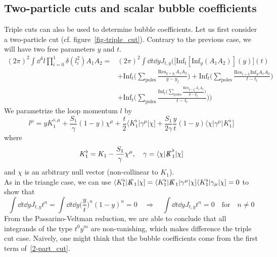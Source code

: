 \subsection*{Two-particle cuts and scalar bubble coefficients}
Triple cuts can also be used to determine bubble coefficients. 
Let us first consider a two-particle cut (cf. figure~\ref{fig-triple_cut}).
Contrary to the previous case, we will have two free parameters $y$ and $t$.
\begin{equation}\label{2-part_cut}
\begin{split}
(2\pi)^2\int \dd^4 l \prod_{i=0}^1 \delta(l_i^2) A_1 A_2 = & 
(2\pi)^2\int \dd t\dd y J_{t,y}\Big(\big[\mathrm{Inf}_t [\mathrm{Inf}_y(A_1A_2)](y)\big](t) 
\\&
+
\mathrm{Inf}_t\big(\sum_{\textrm{poles}}\frac{\mathrm{Res}_{y = y_i}A_1A_2}{y-y_j})
+
\mathrm{Inf}_t\big(\sum_{\textrm{poles}}\frac{\mathrm{Res}_{t = t_l}\mathrm{Inf}_y A_1A_2}{t-t_l})
\\ &
+
\mathrm{Inf}_t\big(\sum_{\textrm{poles}}\frac{\mathrm{Inf}_t\big(\sum_{\textrm{poles}}\frac{\mathrm{Res}_{y = y_i}A_1A_2}{y-y_j}\big)}{t-t_l}\big)
\Big)
\end{split}
\end{equation}
We parametrize the loop momentum $l$ by
\begin{equation*}
l^\mu = yK_1^{\flat,\mu} + \frac{S_1}{\gamma}(1-y)\chi^\mu + \frac{t}{2}\langle K_1^\flat|\gamma^\mu|\chi] + \frac{S_1}{2\gamma}\frac{y}{t}(1-y)\langle \chi|\gamma^\mu|K_1^\flat]
\end{equation*}
where
\begin{equation*}
K_1^\flat = K_1 - \frac{S_1}{\gamma}\chi^\mu ,\quad
\gamma = \langle \chi | \slashed{K}_1^\flat|\chi]
\end{equation*}
and $\chi$ is an arbitrary null vector (non-collinear to $K_1$).
\\
As in the triangle case, we can use $\langle K_1^\flat| \slashed{K}_1|\chi] = \langle K_1^\flat|\slashed{K}_1 | \gamma^\mu|\chi]\langle K_1^\flat|\gamma_\mu|\chi]= 0$ to show that
\begin{equation*}
\int\dd t\dd y J_{t,y}t^n = \int \dd t \dd y \big(\frac{y}{t}\big)^n(1-y)^n = 0
\quad\Rightarrow\quad
\int \dd t \dd y J_{t,y}t^n = 0
\quad\textrm{for}\quad n\neq 0
\end{equation*} 
From the Passarino-Veltman reduction, we are able to conclude that all integrands of the type $t^0y^m$ are non-vanishing, which makes difference \wrt the triple cut case. 
Naively, one might think that the bubble coefficients come from the first term of~\cref{2-part_cut}.
